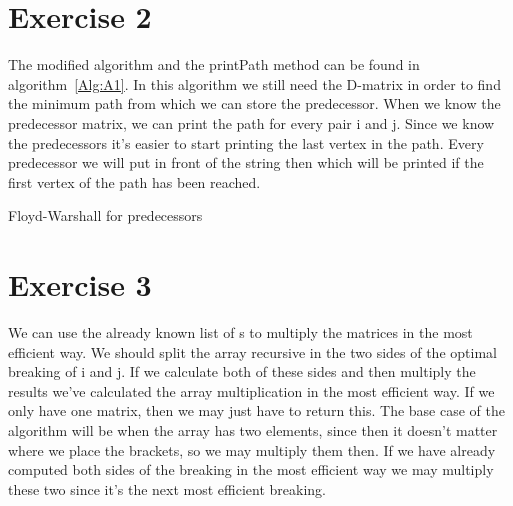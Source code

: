 \documentclass{article}
\begin{document}
\section*{Exercise 2}
The modified algorithm and the printPath method can be found in algorithm~\ref{Alg:A1}. In this algorithm we still need the D-matrix in order to find the minimum path from which we can store the predecessor. When we know the predecessor matrix, we can print the path for every pair i and j. Since we know the predecessors it's easier to start printing the last vertex in the path. Every predecessor we will put in front of the string then which will be printed if the first vertex of the path has been reached.
\begin{algorithm}[h]
  \DontPrintSemicolon


    \caption{Floyd-Warshall for predecessors} \label{Alg:A1}
\end{algorithm}

\newpage
\section*{Exercise 3}
We can use the already known list of s to multiply the matrices in the most efficient way. We should split the array recursive in the two sides of the optimal breaking of i and j. If we calculate both of these sides and then multiply the results we've calculated the array multiplication in the most efficient way. If we only have one matrix, then we may just have to return this. The base case of the algorithm will be when the array has two elements, since then it doesn't matter where we place the brackets, so we may multiply them then. If we have already computed both sides of the breaking in the most efficient way we may multiply these two since it's the next most efficient breaking.
\end{document}
